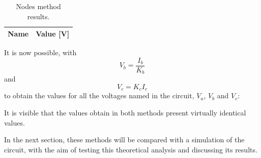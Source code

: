 \begin{table}[H]
  \centering
  \begin{tabular}{|c|c|}
    \hline    
    {\bf Name} & {\bf Value [V]} \\ \hline
    
  \end{tabular}
  \caption{Nodes method results.}
  \label{tab:op}
\end{table}

\par It is now possible, with
\begin{equation}
	V_b=\frac{I_b}{K_b}
\label{Vb}
\end{equation}
and
\begin{equation}
	V_c=K_{c}I_{c}
\end{equation}
to obtain the values for all the voltages named in the circuit, $V_a$, $V_b$ and $V_c$:


\par It is visible that the values obtain in both methods present virtually identical values.

\par In the next section, these methods will be compared with a simulation of the circuit, with the aim of testing this theoretical analysis and discussing its results.
\newpage
